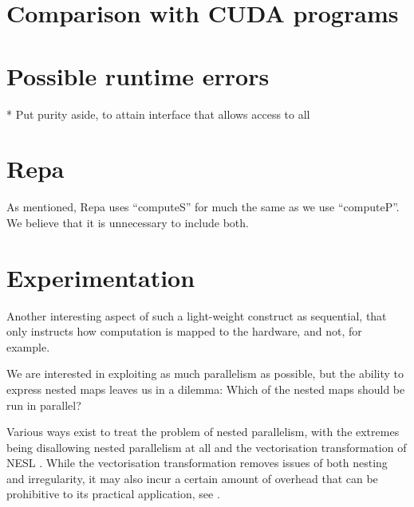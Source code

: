 \section{Comparison with CUDA programs}



\section{Possible runtime errors}

* Put purity aside, to attain interface that allows access to all

\section{Repa}
As mentioned,
Repa uses ``computeS'' for much the same as we use ``computeP''. We
believe that it is unnecessary to include both.

\section{Experimentation}
Another interesting aspect of such a light-weight construct as
sequential, that only instructs how computation is mapped to the
hardware, and not, for example.








We are interested in exploiting as much parallelism as possible, but the
ability to express nested maps leaves us in a dilemma: Which of the nested maps
should be run in parallel?

Various ways exist to treat the problem of nested parallelism, with the
extremes being disallowing nested parallelism at all and the vectorisation
transformation of NESL \cite{nesl}. While the vectorisation transformation
removes issues of both nesting and irregularity, it may also incur a certain
amount of overhead that can be prohibitive to its practical application, see
\cite{Catanzaro2011}.

